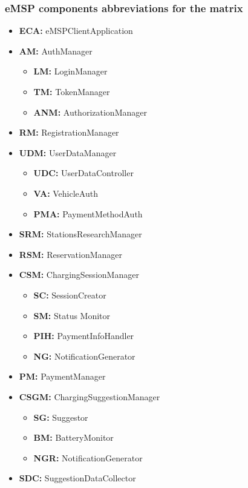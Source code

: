 \documentclass{Configuration_Files/PoliMi3i_thesis}
\begin{document}
\subsubsection{eMSP components abbreviations for the matrix}
\begin{itemize}
    \item \textbf{ECA:} eMSPClientApplication
    \item \textbf{AM:} AuthManager
    \begin{itemize}
        \item \textbf{LM:} LoginManager
        \item \textbf{TM:} TokenManager
        \item \textbf{ANM:} AuthorizationManager
    \end{itemize}
    \item \textbf{RM:} RegistrationManager
    \item \textbf{UDM:} UserDataManager
    \begin{itemize}
        \item \textbf{UDC:} UserDataController
        \item \textbf{VA:} VehicleAuth
        \item \textbf{PMA:} PaymentMethodAuth
    \end{itemize}
    \item \textbf{SRM:} StationsResearchManager
    \item \textbf{RSM:} ReservationManager
    \item \textbf{CSM:} ChargingSessionManager
    \begin{itemize}
        \item \textbf{SC:} SessionCreator
        \item \textbf{SM:} Status Monitor
        \item \textbf{PIH:} PaymentInfoHandler
        \item \textbf{NG:} NotificationGenerator
    \end{itemize}
    \item \textbf{PM:} PaymentManager
    \item \textbf{CSGM:} ChargingSuggestionManager
    \begin{itemize}
        \item \textbf{SG:} Suggestor
        \item\textbf{BM:} BatteryMonitor
        \item\textbf{NGR:} NotificationGenerator
    \end{itemize}
    \item \textbf{SDC:} SuggestionDataCollector

\end{itemize}
\end{document}
